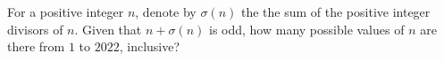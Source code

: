 For a positive integer $n$, denote by $\sigma (n)$ the the sum of the positive integer divisors of $n$. Given that $n + \sigma (n)$ is odd, how many possible values of $n$ are there from $1$ to $2022$, inclusive?
